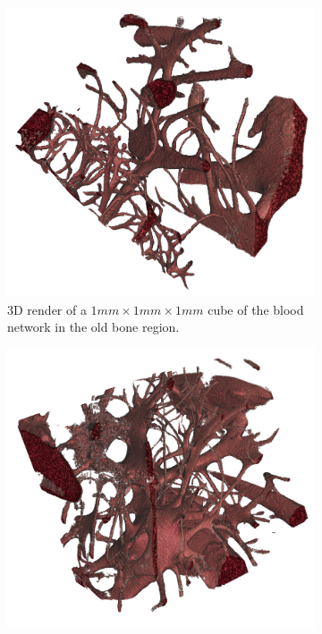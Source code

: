 \begin{figure}
\begin{subfigure}[b]{.45\linewidth}
        \includegraphics[width=\linewidth,height=\linewidth]{figures/blood_old_cube.png}
        \caption{3D render of a $1mm \times 1 mm \times 1 mm$ cube of the blood network in the old bone region.}
        \label{fig:blood-old-cube}
    \end{subfigure}
    \hfill
    \begin{subfigure}[b]{.45\linewidth}
        \includegraphics[width=\linewidth,height=\linewidth]{figures/blood_new_cube.png}

\end{subfigure}
\end{figure}
